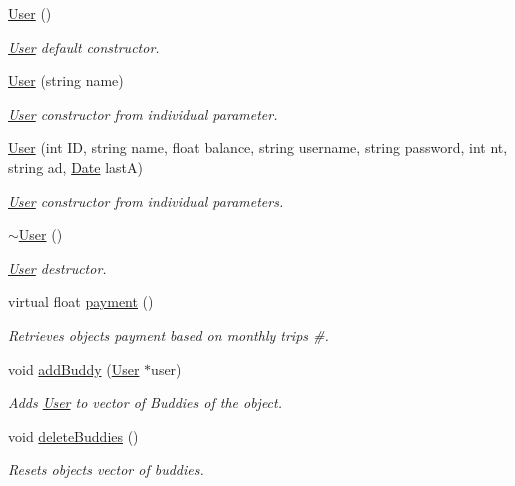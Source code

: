 \begin{DoxyCompactItemize}
\item 
\hyperlink{group___user_ga4a0137053e591fbb79d9057dd7d2283d}{User} ()
\begin{DoxyCompactList}\small\item\em \hyperlink{class_user}{User} default constructor. \end{DoxyCompactList}\item 
\hyperlink{group___user_gab4d18a829f31eae091669ac36782a396}{User} (string name)
\begin{DoxyCompactList}\small\item\em \hyperlink{class_user}{User} constructor from individual parameter. \end{DoxyCompactList}\item 
\hyperlink{group___user_ga4cad036bd4872821fa6c2585c8778461}{User} (int ID, string name, float balance, string username, string password, int nt, string ad, \hyperlink{class_date}{Date} lastA)
\begin{DoxyCompactList}\small\item\em \hyperlink{class_user}{User} constructor from individual parameters. \end{DoxyCompactList}\item 
\hyperlink{group___user_gac00b72ad64eb4149f7b21b9f5468c2b2}{$\sim$\+User} ()
\begin{DoxyCompactList}\small\item\em \hyperlink{class_user}{User} destructor. \end{DoxyCompactList}\item 
virtual float \hyperlink{group___user_gac8563338d1d8086cd5485ad8c1ed4499}{payment} ()
\begin{DoxyCompactList}\small\item\em Retrieves object\textquotesingle{}s payment based on monthly trips \#. \end{DoxyCompactList}\item 
void \hyperlink{group___user_ga72cde56f7a6c5abcf8a22dcd6fdc8449}{add\+Buddy} (\hyperlink{class_user}{User} $\ast$user)
\begin{DoxyCompactList}\small\item\em Adds \hyperlink{class_user}{User} to vector of Buddies of the object. \end{DoxyCompactList}\item 
void \hyperlink{group___user_gaaaa81787feebf8150cc2553e13edb8f7}{delete\+Buddies} ()
\begin{DoxyCompactList}\small\item\em Resets object\textquotesingle{}s vector of buddies. \end{DoxyCompactList}\item 

\end{DoxyCompactItemize}
